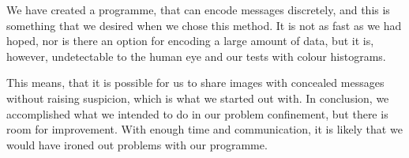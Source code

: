 We have created a programme, that can encode messages discretely, and this is something that we desired when we chose this method. 
It is not as fast as we had hoped, nor is there an option for encoding a large amount of data, but it is, however, undetectable to the human eye and our tests with colour histograms.

This means, that it is possible for us to share images with concealed messages without raising suspicion, which is what we started out with. 
In conclusion, we accomplished what we intended to do in our problem confinement, but there is room for improvement.
With enough time and communication, it is likely that we would have ironed out problems with our programme.
